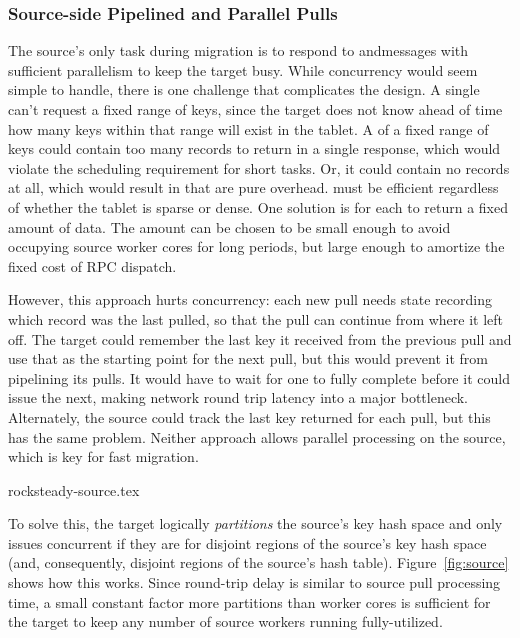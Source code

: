 \subsubsection{Source-side Pipelined and Parallel Pulls}
\label{sec:source}
The source's only task during migration is to respond
to \pull and\linebreak{}\priopull messages with sufficient parallelism to
keep the target busy. While concurrency would seem
simple to handle, there is one challenge that complicates the design.
A single \pull can't request a fixed range of keys, since the target does not know
ahead of time how many keys within that range will exist in the tablet. A \pull of a fixed range of keys
could contain too many records to return in a single response, which would violate
the scheduling requirement for short tasks. Or, it could contain no
records at all, which would result in \pulls that are pure overhead.  \pull must be efficient
regardless of whether the tablet is sparse or dense. One solution is for each
\pull to return a fixed amount of data. The amount can be chosen to be small
enough to avoid occupying source worker cores for long periods, but large
enough to amortize the fixed cost of RPC dispatch.

However, this approach hurts concurrency:  each new pull needs state recording which
record was the last pulled, so that the pull can continue from where it left off.
The target could remember the last key it received from the previous pull and
use that as the starting point for the next pull, but this would prevent it
from pipelining its pulls.
It would have to wait for one to fully complete before it could
issue the next, making network round trip latency into a major bottleneck.
Alternately, the source could track
the last key returned for each pull, but this has the same problem.  Neither
approach allows parallel \pull processing on the source, which is key for fast
migration.

 {rocksteady-source.tex}

To solve this, the target logically {\em partitions} the source's key hash
space and only issues concurrent \pulls if they are for disjoint regions of the
source's key hash space (and, consequently, disjoint regions of the source's
hash table).  Figure~\ref{fig:source} shows how this works.
Since round-trip delay is similar to source pull processing time,
a small constant factor more partitions than worker cores is sufficient for the
target to keep any number of source workers running fully-utilized.

